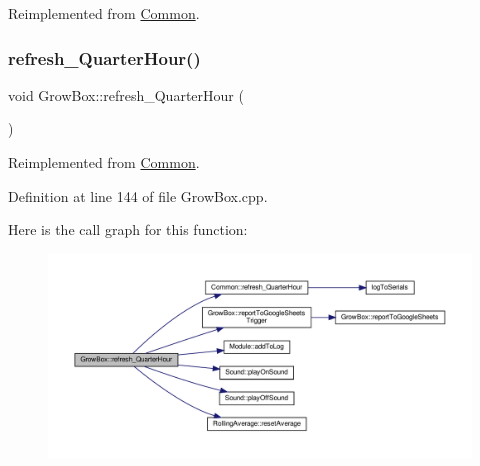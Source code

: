 Reimplemented from \hyperlink{class_common_aa7222229739c89d441fadd6a40deff89}{Common}.

\mbox{\label{class_grow_box_ac542032f42c8d6eac941ba4d98b73447}} 
\subsubsection{\texorpdfstring{refresh\+\_\+\+Quarter\+Hour()}{refresh\_QuarterHour()}\hspace{0.1cm}{\footnotesize\ttfamily [2/2]}}
{\footnotesize\ttfamily void Grow\+Box\+::refresh\+\_\+\+Quarter\+Hour (\begin{DoxyParamCaption}{ }\end{DoxyParamCaption})\hspace{0.3cm}{\ttfamily [virtual]}}



Reimplemented from \hyperlink{class_common_aa7222229739c89d441fadd6a40deff89}{Common}.



Definition at line 144 of file Grow\+Box.\+cpp.

Here is the call graph for this function\+:
\nopagebreak
\begin{figure}[H]
\begin{center}
\leavevmode
\includegraphics[width=350pt]{class_grow_box_ac542032f42c8d6eac941ba4d98b73447_cgraph}
\end{center}
\end{figure}
\mbox{\label{class_grow_box_aac4b1240925ce9791d1a1c804839d345}} 
